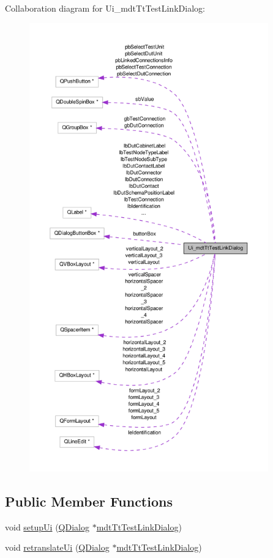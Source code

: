 Collaboration diagram for Ui\-\_\-mdt\-Tt\-Test\-Link\-Dialog\-:\nopagebreak
\begin{figure}[H]
\begin{center}
\leavevmode
\includegraphics[height=550pt]{class_ui__mdt_tt_test_link_dialog__coll__graph}
\end{center}
\end{figure}
\subsection*{Public Member Functions}
\begin{DoxyCompactItemize}
\item 
void \hyperlink{class_ui__mdt_tt_test_link_dialog_ae3ddc348478c06deed430a1ce21376ed}{setup\-Ui} (\hyperlink{class_q_dialog}{Q\-Dialog} $\ast$\hyperlink{classmdt_tt_test_link_dialog}{mdt\-Tt\-Test\-Link\-Dialog})
\item 
void \hyperlink{class_ui__mdt_tt_test_link_dialog_a59bbb8972f3732033838dd99884d8694}{retranslate\-Ui} (\hyperlink{class_q_dialog}{Q\-Dialog} $\ast$\hyperlink{classmdt_tt_test_link_dialog}{mdt\-Tt\-Test\-Link\-Dialog})
\end{DoxyCompactItemize}
